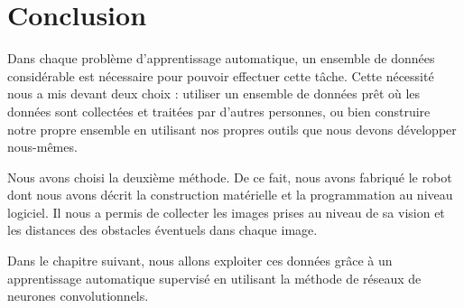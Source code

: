 \section{Conclusion}

Dans chaque problème d'apprentissage automatique, un ensemble de données considérable
est nécessaire pour pouvoir effectuer cette tâche. Cette nécessité nous a mis devant
deux choix : utiliser un ensemble de données prêt où les données sont collectées
et traitées par d'autres personnes, ou bien construire notre propre ensemble en
utilisant nos propres outils que nous devons développer nous-mêmes.

Nous avons choisi la deuxième méthode. De ce fait, nous avons
fabriqué le robot dont nous avons décrit la construction matérielle et la
programmation au niveau logiciel. Il nous a permis de collecter les images
prises au niveau de sa vision et les distances des obstacles éventuels dans
chaque image.

Dans le chapitre suivant, nous allons exploiter ces données grâce à
un apprentissage automatique supervisé en utilisant la méthode de
réseaux de neurones convolutionnels.
